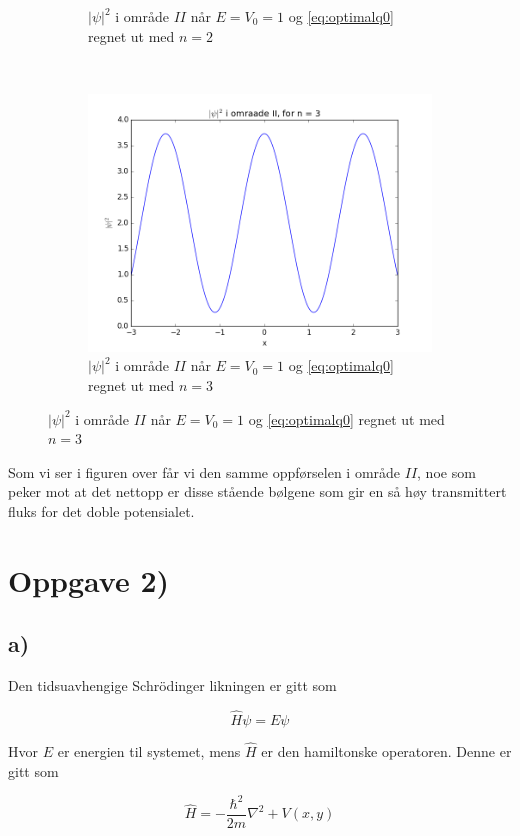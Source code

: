 \documentclass[a4paper,norsk, 10pt]{article}
\numberwithin{equation}{section}
\begin{document}
\begin{figure}[H]
\begin{subfigure}{0.3\textwidth}
\caption{$|\psi|^2$ i område $II$ når $E = V_0 = 1$ og \eqref{eq:optimalq0} regnet ut med $n=2$}
\end{subfigure}
~
\begin{subfigure}{0.3\textwidth}
\centering
\includegraphics[width = \textwidth]{psin3.png}
\caption{$|\psi|^2$ i område $II$ når $E = V_0 = 1$ og \eqref{eq:optimalq0} regnet ut med $n=3$}
\end{subfigure}
\end{figure}

Som vi ser i figuren over får vi den samme oppførselen i område $II$, noe som peker mot at det nettopp er disse stående bølgene som gir en så høy transmittert fluks for det doble potensialet.


\section{Oppgave 2)}

\subsection*{a)}

Den tidsuavhengige Schrödinger likningen er gitt som 

\begin{equation}
\hat{H}\psi = E\psi
\label{eq:TUSL}
\end{equation}

Hvor $E$ er energien til systemet, mens $\hat{H}$ er den hamiltonske operatoren. Denne er gitt som

$$
\hat{H} = -\frac{\hbar^2}{2m}\nabla^2  + V(x,y)
$$
\end{document}
